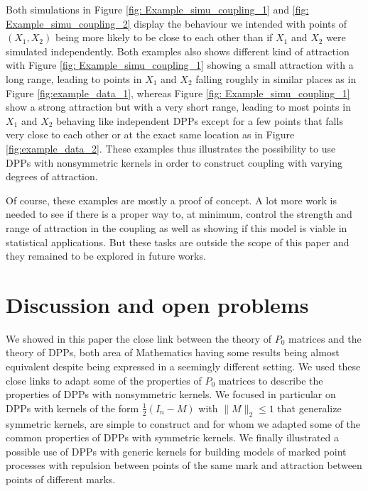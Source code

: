 \documentclass{article}
\numberwithin{equation}{section}
\renewcommand{\leq}{\leqslant}
\theoremstyle{plain}
\begin{document}
\noindent Both simulations in Figure \ref{fig: Example_simu_coupling_1} and \ref{fig: Example_simu_coupling_2} display the behaviour we intended with points of $(X_1, X_2)$ being more likely to be close to each other than if $X_1$ and $X_2$ were simulated independently. Both examples also shows different kind of attraction with Figure \ref{fig: Example_simu_coupling_1} showing a small attraction with a long range, leading to points in $X_1$ and $X_2$ falling roughly in similar places as in Figure \ref{fig:example_data_1}, whereas Figure \ref{fig: Example_simu_coupling_1} show a strong attraction but with a very short range, leading to most points in $X_1$ and $X_2$ behaving like independent DPPs except for a few points that falls very close to each other or at the exact same location as in Figure \ref{fig:example_data_2}. These examples thus illustrates the possibility to use DPPs with nonsymmetric kernels in order to construct coupling with varying degrees of attraction.

\medskip

\noindent Of course, these examples are mostly a proof of concept. A lot more work is needed to see if there is a proper way to, at minimum, control the strength and range of attraction in the coupling as well as showing if this model is viable in statistical applications. But these tasks are outside the scope of this paper and they remained to be explored in future works.

\section{Discussion and open problems}

We showed in this paper the close link between the theory of $P_0$ matrices and the theory of DPPs, both area of Mathematics having some results being almost equivalent despite being expressed in a seemingly different setting. We used these close links to adapt some of the properties of $P_0$ matrices to describe the properties of DPPs with nonsymmetric kernels. We focused in particular on DPPs with kernels of the form $\frac{1}{2}(I_n - M)$ with $\|M\|_2\leq 1$ that generalize symmetric kernels, are simple to construct and for whom we adapted some of the common properties of DPPs with symmetric kernels. We finally illustrated a possible use of DPPs with generic kernels for building models of marked point processes with repulsion between points of the same mark and attraction between points of different marks.

\medskip
\end{document}
